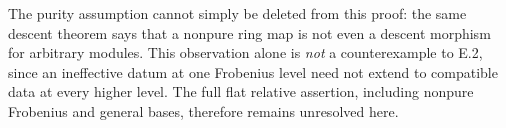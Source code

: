 The purity assumption cannot simply be deleted from this proof: the same descent theorem says that a nonpure ring map is not even a descent morphism for arbitrary modules.  This observation alone is \emph{not} a counterexample to E.2, since an ineffective datum at one Frobenius level need not extend to compatible data at every higher level.  The full flat relative assertion, including nonpure Frobenius and general bases, therefore remains unresolved here.
